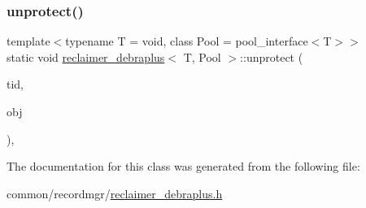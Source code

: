 \subsubsection{\texorpdfstring{unprotect()}{unprotect()}}
{\footnotesize\ttfamily template$<$typename T  = void, class Pool  = pool\+\_\+interface$<$\+T$>$$>$ \\
static void \hyperlink{classreclaimer__debraplus}{reclaimer\+\_\+debraplus}$<$ T, Pool $>$\+::unprotect (\begin{DoxyParamCaption}\item[{const int}]{tid,  }\item[{T $\ast$const}]{obj }\end{DoxyParamCaption})\hspace{0.3cm}{\ttfamily [inline]}, {\ttfamily [static]}}



The documentation for this class was generated from the following file\+:\begin{DoxyCompactItemize}
\item 
common/recordmgr/\hyperlink{reclaimer__debraplus_8h}{reclaimer\+\_\+debraplus.\+h}\end{DoxyCompactItemize}
